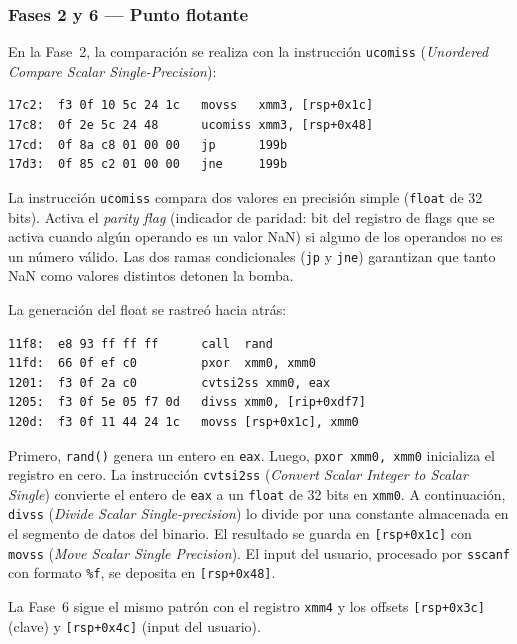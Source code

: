 \documentclass[10pt,a4paper]{article}
\begin{document}
\subsubsection*{Fases 2 y 6 — Punto flotante}

En la Fase~2, la comparación se realiza con la instrucción \texttt{ucomiss} (\textit{Unordered Compare Scalar Single-Precision}):

\begin{lstlisting}[style=asmstyle, caption={Comparacion de float --- Fase 2 (offset 0x17c2)}]
17c2:  f3 0f 10 5c 24 1c   movss   xmm3, [rsp+0x1c]
17c8:  0f 2e 5c 24 48      ucomiss xmm3, [rsp+0x48]
17cd:  0f 8a c8 01 00 00   jp      199b
17d3:  0f 85 c2 01 00 00   jne     199b
\end{lstlisting}

La instrucción \texttt{ucomiss} compara dos valores en precisión simple (\texttt{float} de 32 bits). Activa el \textit{parity flag} (indicador de paridad: bit del registro de flags que se activa cuando algún operando es un valor NaN) si alguno de los operandos no es un número válido. Las dos ramas condicionales (\texttt{jp} y \texttt{jne}) garantizan que tanto NaN como valores distintos detonen la bomba.

La generación del float se rastreó hacia atrás:

\begin{lstlisting}[style=asmstyle, caption={Cadena de generacion del float --- Fase 2}]
11f8:  e8 93 ff ff ff      call  rand
11fd:  66 0f ef c0         pxor  xmm0, xmm0
1201:  f3 0f 2a c0         cvtsi2ss xmm0, eax
1205:  f3 0f 5e 05 f7 0d   divss xmm0, [rip+0xdf7]
120d:  f3 0f 11 44 24 1c   movss [rsp+0x1c], xmm0
\end{lstlisting}

Primero, \texttt{rand()} genera un entero en \texttt{eax}. Luego, \texttt{pxor xmm0, xmm0} inicializa el registro en cero. La instrucción \texttt{cvtsi2ss} (\textit{Convert Scalar Integer to Scalar Single}) convierte el entero de \texttt{eax} a un \texttt{float} de 32 bits en \texttt{xmm0}. A continuación, \texttt{divss} (\textit{Divide Scalar Single-precision}) lo divide por una constante almacenada en el segmento de datos del binario. El resultado se guarda en \texttt{[rsp+0x1c]} con \texttt{movss} (\textit{Move Scalar Single Precision}). El input del usuario, procesado por \texttt{sscanf} con formato \texttt{\%f}, se deposita en \texttt{[rsp+0x48]}.

La Fase~6 sigue el mismo patrón con el registro \texttt{xmm4} y los offsets \texttt{[rsp+0x3c]} (clave) y \texttt{[rsp+0x4c]} (input del usuario).
\end{document}

